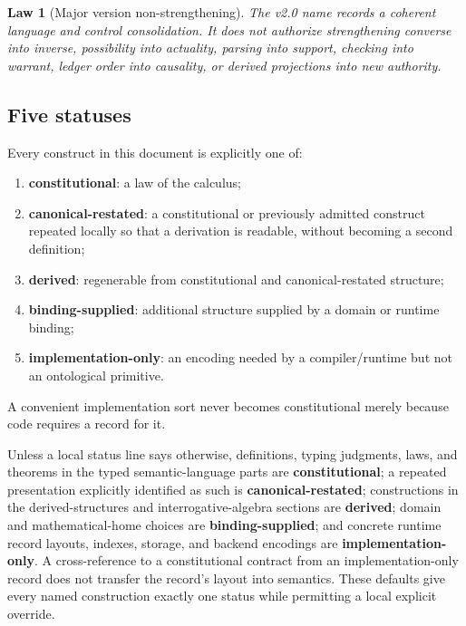 \documentclass[11pt,oneside]{article}
\newtheorem{law}[definition]{Law}
\begin{document}
\begin{law}[Major version non-strengthening]\label{law:v2-nonstrengthening}
The v2.0 name records a coherent language and control consolidation.  It does not authorize
strengthening converse into inverse, possibility into actuality, parsing into support, checking
into warrant, ledger order into causality, or derived projections into new authority.
\end{law}

\subsection{Five statuses}

Every construct in this document is explicitly one of:
\begin{enumerate}
\item \textbf{constitutional}: a law of the calculus;
\item \textbf{canonical-restated}: a constitutional or previously admitted construct repeated locally so that a derivation is readable, without becoming a second definition;
\item \textbf{derived}: regenerable from constitutional and canonical-restated structure;
\item \textbf{binding-supplied}: additional structure supplied by a domain or runtime binding;
\item \textbf{implementation-only}: an encoding needed by a compiler/runtime but not an ontological primitive.
\end{enumerate}

A convenient implementation sort never becomes constitutional merely because code requires a record for it.

Unless a local status line says otherwise, definitions, typing judgments, laws, and theorems in the
typed semantic-language parts are \textbf{constitutional}; a repeated presentation explicitly
identified as such is \textbf{canonical-restated}; constructions in the derived-structures and
interrogative-algebra sections are \textbf{derived}; domain and mathematical-home choices are
\textbf{binding-supplied}; and concrete runtime record layouts, indexes, storage, and backend
encodings are \textbf{implementation-only}.  A cross-reference to a constitutional contract from an
implementation-only record does not transfer the record's layout into semantics.  These defaults
give every named construction exactly one status while permitting a local explicit override.
\end{document}
